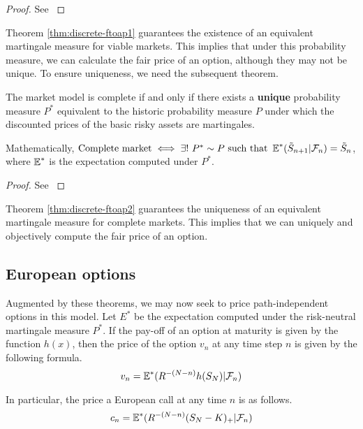 \begin{proof}
	See \cite[page 6, Theorem 1.2.7]{Lamberton1996}
\end{proof}

Theorem \ref{thm:discrete-ftoap1} guarantees the existence of an equivalent martingale measure for viable markets. This implies that under this probability measure, we can calculate the fair price of an option, although they may not be unique. To ensure uniqueness, we need the subsequent theorem.

\begin{thm}
	\label{thm:discrete-ftoap2}
	The market model is complete if and only if there exists a \textbf{unique} probability measure $ P^* $ equivalent to the historic probability measure $ P $ under which the discounted prices of the basic risky assets are martingales.
	
	Mathematically,
	$ \text{Complete market} \iff \exists! \  P^* \sim P \text{ such that } \operatorname{\mathbb{E}}^*( \tilde{S}_{n+1} | \mathcal{F}_n ) = \tilde{S}_{n} $, where $ \operatorname{\mathbb{E}}^* $ is the expectation computed under $ P^* $.
\end{thm}

\begin{proof}
	See \cite[page 9, Theorem 1.3.4]{Lamberton1996}
\end{proof}

Theorem \ref{thm:discrete-ftoap2} guarantees the uniqueness of an equivalent martingale measure for complete markets. This implies that we can uniquely and objectively compute the fair price of an option.



\subsection{European options}
\label{subsec:discrete-eu}

Augmented by these theorems, we may now seek to price path-independent options in this model. Let $ E^* $ be the expectation computed under the risk-neutral martingale measure $ P^* $. If the pay-off of an option at maturity is given by the function $ h(x) $, then the price of the option $ v_n $ at any time step $ n $ is given by the following formula.
\begin{equation}
	\label{eq:discrete-crr-option-pr}
	v_n = \operatorname{\mathbb{E}}^*( R^{-(N - n)} h(S_N) | \mathcal{F}_n )
\end{equation}

In particular, the price a European call at any time $ n $ is as follows.
\begin{equation}
	\label{eq:discrete-crr-eu-call-pr}
	c_n = \operatorname{\mathbb{E}}^*( R^{-(N - n)} (S_N - K)_+ | \mathcal{F}_n )
\end{equation}


